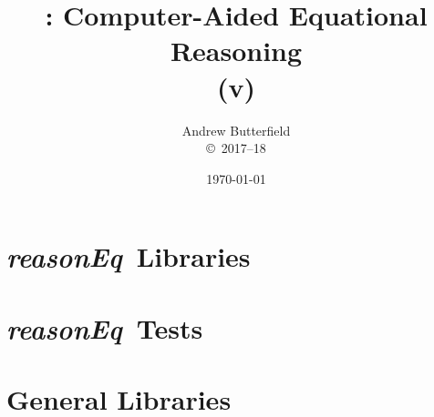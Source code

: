 \documentclass[fleqn,10pt]{report}
\author{
Andrew Butterfield
\\
{\small \copyright\ 2017--18}
}
\title{
  \reasonEq: Computer-Aided Equational Reasoning
  \\(v\reqVersion)
}
\date{
\today
}
\def\reasonEq{\textit{\textsf{reasonEq}}}
\begin{document}
\maketitle
\tableofcontents

%
% 

\chapter{\reasonEq\ Libraries}

% 
% 
% 
% 
% 
% 
% 
\newpage

% 
% 
% 
% 
% 
\newpage

% 
% 
% 
% 
% 
% 
\newpage

% 
% 
% 
% 
% 
% 
% 
% 
% 
% 
% 
% 
\newpage

% 

\newpage


\chapter{\reasonEq\ Tests}
%
\newpage

%
\chapter{General Libraries}
%

% 
% 
%


%
%
%
% 
\end{document}
